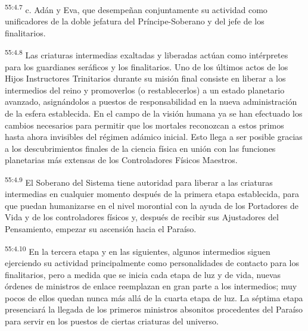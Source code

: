 \par
\textsuperscript{55:4.7} c. Adán y Eva, que desempeñan conjuntamente su actividad como unificadores de la doble jefatura del Príncipe-Soberano y del jefe de los finalitarios.

\par
\textsuperscript{55:4.8} Las criaturas intermedias exaltadas y liberadas actúan como intérpretes para los guardianes seráficos y los finalitarios. Uno de los últimos actos de los Hijos Instructores Trinitarios durante su misión final consiste en liberar a los intermedios del reino y promoverlos (o restablecerlos) a un estado planetario avanzado, asignándolos a puestos de responsabilidad en la nueva administración de la esfera establecida. En el campo de la visión humana ya se han efectuado los cambios necesarios para permitir que los mortales reconozcan a estos primos hasta ahora invisibles del régimen adámico inicial. Esto llega a ser posible gracias a los descubrimientos finales de la ciencia física en unión con las funciones planetarias más extensas de los Controladores Físicos Maestros.

\par
\textsuperscript{55:4.9} El Soberano del Sistema tiene autoridad para liberar a las criaturas intermedias en cualquier momento después de la primera etapa establecida, para que puedan humanizarse en el nivel morontial con la ayuda de los Portadores de Vida y de los controladores físicos y, después de recibir sus Ajustadores del Pensamiento, empezar su ascensión hacia el Paraíso.

\par
\textsuperscript{55:4.10} En la tercera etapa y en las siguientes, algunos intermedios siguen ejerciendo su actividad principalmente como personalidades de contacto para los finalitarios, pero a medida que se inicia cada etapa de luz y de vida, nuevas órdenes de ministros de enlace reemplazan en gran parte a los intermedios; muy pocos de ellos quedan nunca más allá de la cuarta etapa de luz. La séptima etapa presenciará la llegada de los primeros ministros absonitos procedentes del Paraíso para servir en los puestos de ciertas criaturas del universo.

